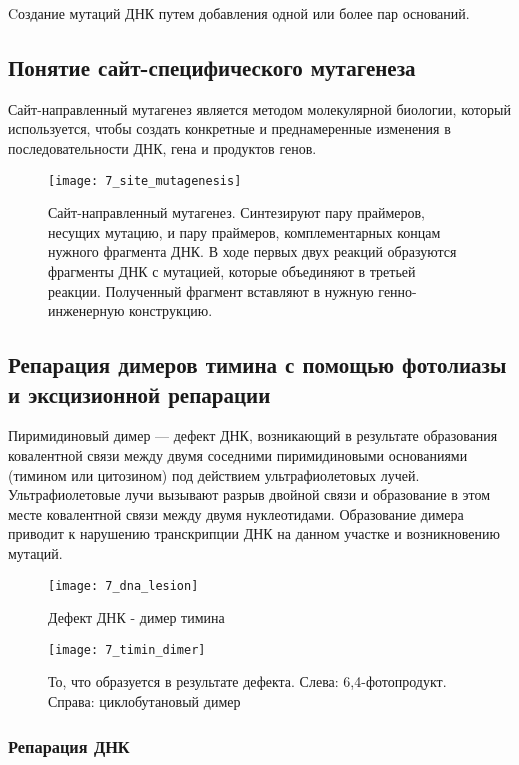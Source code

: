 Cоздание мутаций ДНК путем добавления одной или более пар оснований. \\

\subsection{Понятие сайт-специфического мутагенеза}

Сайт-направленный мутагенез является методом молекулярной биологии, который используется, чтобы создать конкретные и преднамеренные изменения в последовательности ДНК, гена и продуктов генов.

\begin{figure}[H]
	\centering
	\texttt{[image: 7\_site\_mutagenesis]}
	\caption{Сайт-направленный мутагенез. Синтезируют пару праймеров, несущих мутацию, и пару праймеров, комплементарных концам нужного фрагмента ДНК. В ходе первых двух реакций образуются фрагменты ДНК с мутацией, которые объединяют в третьей реакции. Полученный фрагмент вставляют в нужную генно-инженерную конструкцию.}
	\label{7_site_mutagenesis}
\end{figure}

\subsection{Репарация димеров тимина с помощью фотолиазы и эксцизионной репарации}

Пиримидиновый димер — дефект ДНК, возникающий в результате образования ковалентной связи между двумя соседними пиримидиновыми основаниями (тимином или цитозином) под действием ультрафиолетовых лучей. Ультрафиолетовые лучи вызывают разрыв двойной связи и образование в этом месте ковалентной связи между двумя нуклеотидами. Образование димера приводит к нарушению транскрипции ДНК на данном участке и возникновению мутаций.

\begin{figure}[H]
	\centering
	\texttt{[image: 7\_dna\_lesion]}
	\caption{Дефект ДНК - димер тимина}
	\label{7_dna_lesion}
\end{figure}
	
\begin{figure}[H]
	\centering
	\texttt{[image: 7\_timin\_dimer]}
	\caption{То, что образуется в результате дефекта. Слева: 6,4-фотопродукт. Справа: циклобутановый димер}
	\label{7_timin_dimer}
\end{figure}
	
\subsubsection{Репарация ДНК}

